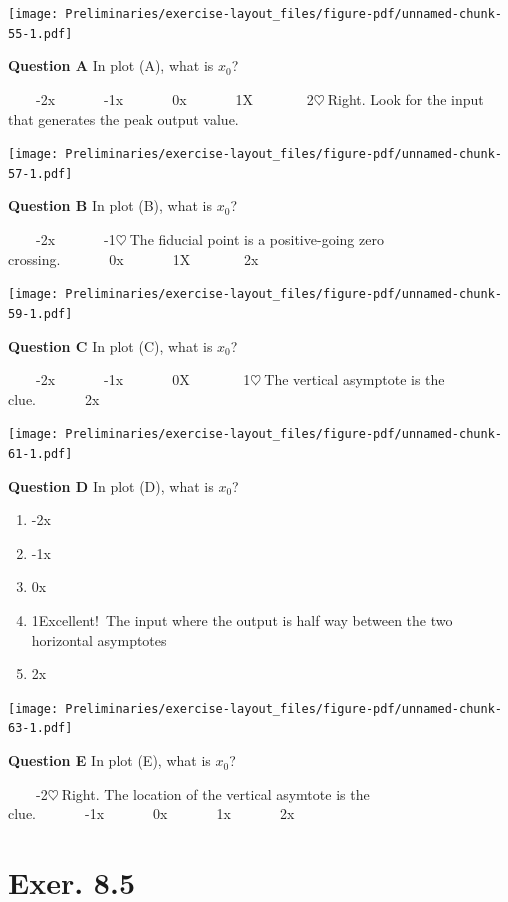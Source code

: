 \documentclass[
  letterpaper,
  DIV=11,
  numbers=noendperiod,
  oneside]{article}
\providecommand{\tightlist}{%
  \setlength{\itemsep}{0pt}\setlength{\parskip}{0pt}}\usepackage{longtable,booktabs,array}
\begin{document}
\begin{multicols}{2}
\texttt{[image: Preliminaries/exercise-layout\_files/figure-pdf/unnamed-chunk-55-1.pdf]}

\textbf{Question A} In plot (A), what is \(x_0\)?

~~~~{-2{x}}~~~~~~~{-1{x}}~~~~~~~{0{x}}~~~~~~~{1{︎X
}}~~~~~~~{2{\(\heartsuit\ \)Right. Look for the input that generates the
peak output value.}}

\texttt{[image: Preliminaries/exercise-layout\_files/figure-pdf/unnamed-chunk-57-1.pdf]}

\textbf{Question B} In plot (B), what is \(x_0\)?

~~~~{-2{x}}~~~~~~~{-1{\(\heartsuit\ \)The fiducial point is a
positive-going zero crossing.}}~~~~~~~{0{x}}~~~~~~~{1{︎X
}}~~~~~~~{2{x}}

\texttt{[image: Preliminaries/exercise-layout\_files/figure-pdf/unnamed-chunk-59-1.pdf]}

\textbf{Question C} In plot (C), what is \(x_0\)?

~~~~{-2{x}}~~~~~~~{-1{x}}~~~~~~~{0{︎X
}}~~~~~~~{1{\(\heartsuit\ \)The vertical asymptote is the
clue.}}~~~~~~~{2{x}}

\texttt{[image: Preliminaries/exercise-layout\_files/figure-pdf/unnamed-chunk-61-1.pdf]}

\textbf{Question D} In plot (D), what is \(x_0\)?

\begin{enumerate}
\def\labelenumi{\roman{enumi}.}
\tightlist
\item
  {-2{x}}\\
\item
  {-1{x}}\\
\item
  {0{x}}\\
\item
  {1{Excellent!~The input where the output is half way between the two
  horizontal asymptotes}}\\
\item
  {2{x}}
\end{enumerate}

\texttt{[image: Preliminaries/exercise-layout\_files/figure-pdf/unnamed-chunk-63-1.pdf]}

\textbf{Question E} In plot (E), what is \(x_0\)?

~~~~{-2{\(\heartsuit\ \)Right. The location of the vertical asymtote is
the clue.}}~~~~~~~{-1{x}}~~~~~~~{0{x}}~~~~~~~{1{x}}~~~~~~~{2{x}}

\hypertarget{exer.-8.5}{%
\section*{Exer. 8.5}\label{exer.-8.5}}


\end{multicols}
\end{document}
